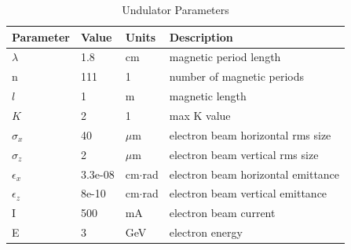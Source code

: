 \documentclass[preprint]{iucr}              %
\begin{document}
\begin{table}\label{ivubiomax}
\caption{Undulator Parameters}
\begin{tabular}{@{}llll@{}}
Parameter       & Value         & Units     & Description                           \\
\hline
$\lambda$       & 1.8           & cm        & magnetic period length                \\
n               & 111           & 1         & number of magnetic periods            \\ 
$l$             & 1             & m         & magnetic length                       \\
$K$             & 2             & 1         & max K value                           \\
$\sigma_x$      & 40            & $\mu$m    & electron beam horizontal rms size     \\
$\sigma_z$      & 2             & $\mu$m    & electron beam vertical rms size       \\
$\epsilon_x$    & 3.3e-08       & cm$\cdot$rad    & electron beam horizontal emittance    \\
$\epsilon_z$    & 8e-10         & cm$\cdot$rad    & electron beam vertical emittance      \\
I               & 500           & mA        & electron beam current                 \\
E               & 3             & GeV       & electron energy                       \\
\end{tabular}
\end{table}
\end{document}

